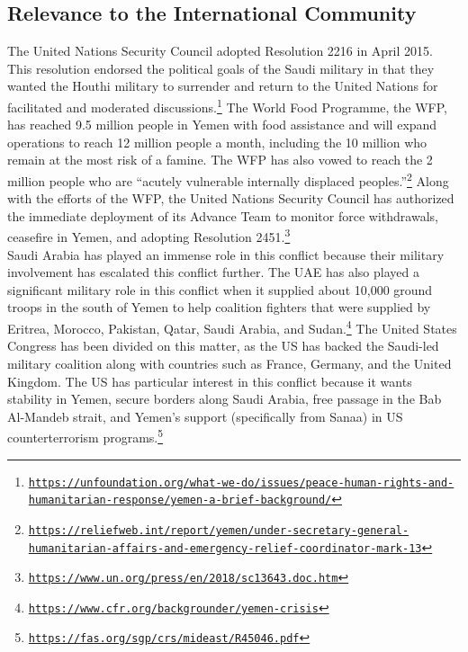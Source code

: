 \documentclass[10pt, letterpaper]{article}
\begin{document}
\subsection{Relevance to the International Community}

The United Nations Security Council adopted Resolution 2216 in April
2015. This resolution endorsed the political goals of the Saudi military
in that they wanted the Houthi military to surrender and return to the
United Nations for facilitated and moderated discussions.\footnote{\texttt{\href{https://unfoundation.org/what-we-do/issues/peace-human-rights-and-humanitarian-response/yemen-a-brief-background/}{{https://unfoundation.org/what-we-do/issues/peace-human-rights-and-humanitarian-response/yemen-a-brief-background/}}}}
The World Food Programme, the WFP, has reached 9.5 million people in
Yemen with food assistance and will expand operations to reach 12
million people a month, including the 10 million who remain at the most
risk of a famine. The WFP has also vowed to reach the 2 million people
who are ``acutely vulnerable internally displaced peoples.''\footnote{\texttt{\href{https://reliefweb.int/report/yemen/under-secretary-general-humanitarian-affairs-and-emergency-relief-coordinator-mark-13}{{https://reliefweb.int/report/yemen/under-secretary-general-humanitarian-affairs-and-emergency-relief-coordinator-mark-13}}}}
Along with the efforts of the WFP, the United Nations Security Council
has authorized the immediate deployment of its Advance Team to monitor
force withdrawals, ceasefire in Yemen, and adopting Resolution
2451.\footnote{\texttt{\href{https://www.un.org/press/en/2018/sc13643.doc.htm}{{https://www.un.org/press/en/2018/sc13643.doc.htm}}}} \\

Saudi Arabia has played an immense role in this conflict because their
military involvement has escalated this conflict further. The UAE has
also played a significant military role in this conflict when it
supplied about 10,000 ground troops in the south of Yemen to help
coalition fighters that were supplied by Eritrea, Morocco, Pakistan,
Qatar, Saudi Arabia, and Sudan.\footnote{\texttt{\href{https://www.cfr.org/backgrounder/yemen-crisis}{{https://www.cfr.org/backgrounder/yemen-crisis}}}}
The United States Congress has been divided on this matter, as the US
has backed the Saudi-led military coalition along with countries such as
France, Germany, and the United Kingdom. The US has particular interest
in this conflict because it wants stability in Yemen, secure borders
along Saudi Arabia, free passage in the Bab Al-Mandeb strait, and
Yemen's support (specifically from Sanaa) in US counterterrorism
programs.\footnote{\texttt{\href{https://fas.org/sgp/crs/mideast/R45046.pdf}{{https://fas.org/sgp/crs/mideast/R45046.pdf}}}} \\
\end{document}
